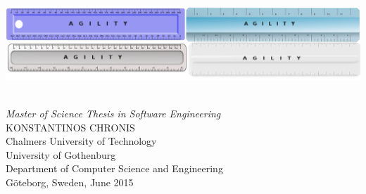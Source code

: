 \begin{titlepage}

\mbox{}
\vfill
\addtolength{\voffset}{2cm}

\includegraphics[scale=0.3]{fig/auxiliary/cover.png}
	
\begin{flushleft}
	{ \\[0.5cm]
\emph{\Large Master of Science Thesis in Software Engineering} \\[.8cm]
	
	{\huge KONSTANTINOS CHRONIS}\\[.8cm]
	
	{\Large Chalmers University of Technology \\
    University of Gothenburg} \\
     Department of Computer Science and Engineering \\
     Göteborg, Sweden, June 2015
  } 
	
\end{flushleft}

\end{titlepage}
\ClearShipoutPicture

\pagestyle{empty}
\newpage
\clearpage
\mbox{}
\newpage
\clearpage
\thispagestyle{empty}

